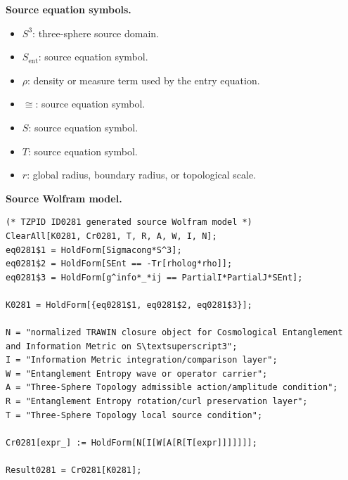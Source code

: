 \begin{minipage}[t]{0.49\linewidth}
\begingroup
\small
\raggedright
\textbf{Source equation symbols.}\par
\begin{itemize}[leftmargin=1.35em,itemsep=1pt,topsep=1pt,parsep=0pt]
    \item $S^3$: three-sphere source domain.
    \item $S_{\mathrm{ent}}$: source equation symbol.
    \item $\rho$: density or measure term used by the entry equation.
    \item $\cong$: source equation symbol.
    \item $S$: source equation symbol.
    \item $T$: source equation symbol.
    \item $r$: global radius, boundary radius, or topological scale.
\end{itemize}
\endgroup
\end{minipage}\hfill
\begin{minipage}[t]{0.47\linewidth}
\begingroup
\scriptsize
\raggedright
\textbf{Source Wolfram model.}\par
\begin{Verbatim}[fontsize=\tiny,breaklines=true,breakanywhere=true]
(* TZPID ID0281 generated source Wolfram model *)
ClearAll[K0281, Cr0281, T, R, A, W, I, N];
eq0281$1 = HoldForm[Sigmacong*S^3];
eq0281$2 = HoldForm[SEnt == -Tr[rholog*rho]];
eq0281$3 = HoldForm[g^info*_*ij == PartialI*PartialJ*SEnt];

K0281 = HoldForm[{eq0281$1, eq0281$2, eq0281$3}];

N = "normalized TRAWIN closure object for Cosmological Entanglement and Information Metric on S\textsuperscript3";
I = "Information Metric integration/comparison layer";
W = "Entanglement Entropy wave or operator carrier";
A = "Three-Sphere Topology admissible action/amplitude condition";
R = "Entanglement Entropy rotation/curl preservation layer";
T = "Three-Sphere Topology local source condition";

Cr0281[expr_] := HoldForm[N[I[W[A[R[T[expr]]]]]]];

Result0281 = Cr0281[K0281];
\end{Verbatim}
\endgroup
\end{minipage}

